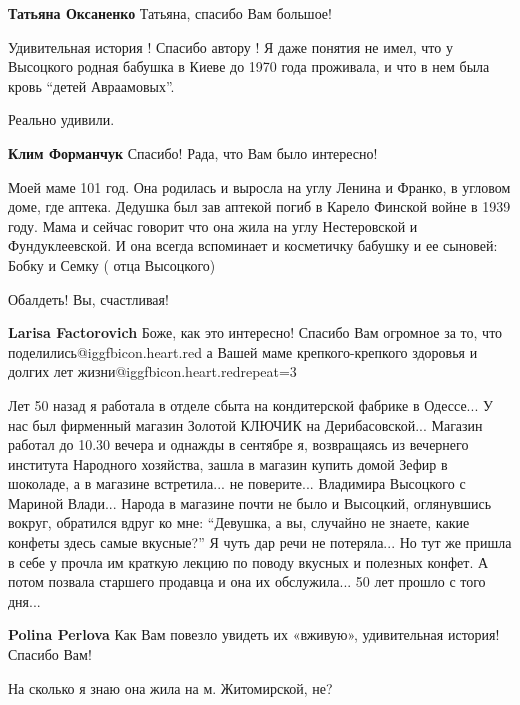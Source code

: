 \begin{itemize}
\textbf{Татьяна Оксаненко} Татьяна, спасибо Вам большое!


Удивительная история ! Спасибо автору ! Я даже понятия не имел, что у Высоцкого
родная бабушка в Киеве до 1970 года проживала, и что в нем была кровь \enquote{детей
Авраамовых}.

Реально удивили.

\textbf{Клим Форманчук} Спасибо! Рада, что Вам было интересно!


Моей маме 101 год. Она родилась и выросла на углу Ленина и Франко, в угловом
доме, где аптека. Дедушка был зав аптекой погиб в Карело Финской войне в 1939
году. Мама и сейчас говорит что она жила на углу Нестеровской и Фундуклеевской.
И она всегда вспоминает и косметичку бабушку и ее сыновей: Бобку и Семку ( отца
Высоцкого)

\begin{itemize} %

Обалдеть! Вы, счастливая!

\textbf{Larisa Factorovich} Боже, как это интересно! Спасибо Вам огромное за
то, что поделились@igg{fbicon.heart.red} а Вашей маме крепкого-крепкого здоровья и долгих лет
жизни@igg{fbicon.heart.red}{repeat=3}
\end{itemize} %


Лет 50 назад я работала в отделе сбыта на кондитерской фабрике в Одессе... У
нас был фирменный магазин Золотой КЛЮЧИК на Дерибасовской... Магазин работал до
10.30 вечера и однажды в сентябре я, возвращаясь из вечернего института
Народного хозяйства, зашла в магазин купить домой Зефир в шоколаде, а в
магазине встретила... не поверите... Владимира Высоцкого с Мариной Влади...
Народа в магазине почти не было и Высоцкий, оглянувшись вокруг, обратился вдруг
ко мне: \enquote{Девушка, а вы, случайно не знаете, какие конфеты здесь самые вкусные?}
Я чуть дар речи не потеряла... Но тут же пришла в себе у прочла им краткую
лекцию по поводу вкусных и полезных конфет. А потом позвала старшего продавца и
она их обслужила... 50 лет прошло с того дня...


\textbf{Polina Perlova} Как Вам повезло увидеть их «вживую», удивительная история! Спасибо Вам!

На сколько я знаю она жила на м. Житомирской, не?


\end{itemize}
